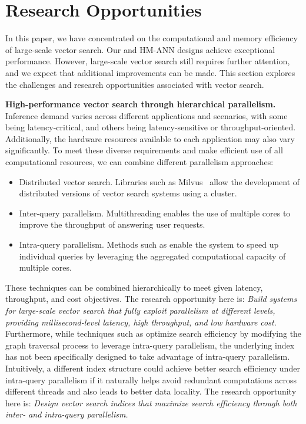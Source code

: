 \section{Research Opportunities}
\label{sec:future}

In this paper, we have concentrated on the computational and memory efficiency of large-scale vector search. Our \Hammer and HM-ANN designs achieve exceptional performance. However, large-scale vector search still requires further attention, and we expect that additional improvements can be made. This section explores the challenges and research opportunities associated with vector search.

\textbf{High-performance vector search through hierarchical parallelism.} Inference demand varies across different applications and scenarios, with some being latency-critical, and others being latency-sensitive or throughput-oriented. Additionally, the hardware resources available to each application may also vary significantly. To meet these diverse requirements and make efficient use of all computational resources, we can combine different parallelism approaches:
\begin{itemize}
    \item Distributed vector search. Libraries such as Milvus~\cite{milvus} allow the development of distributed versions of vector search systems using a cluster.
    \item Inter-query parallelism. Multithreading enables the use of multiple cores to improve the throughput of answering user requests.
    \item Intra-query parallelism. Methods such as \Hammer enable the system to speed up individual queries by leveraging the aggregated computational capacity of multiple cores.
\end{itemize}

These techniques can be combined hierarchically to meet given latency, throughput, and cost objectives. The research opportunity here is: \emph{Build systems for large-scale vector search that fully exploit parallelism at different levels, providing millisecond-level latency, high throughput, and low hardware cost.}
Furthermore, while techniques such as \Hammer optimize search efficiency by modifying the graph traversal process to leverage intra-query parallelism, the underlying index has not been specifically designed to take advantage of intra-query parallelism. Intuitively, a different index structure could achieve better search efficiency under intra-query parallelism if it naturally helps avoid redundant computations across different threads and also leads to better data locality. The research opportunity here is: \emph{Design vector search indices that maximize search efficiency through both inter- and intra-query parallelism. } 

